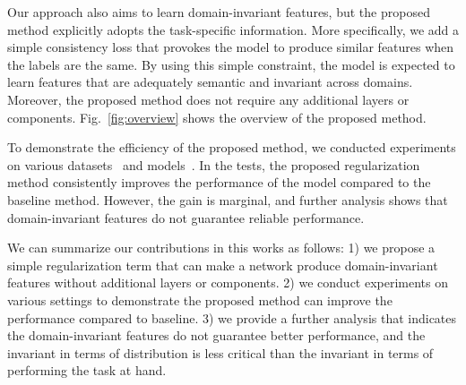 Our approach also aims to learn domain-invariant features, but the proposed method explicitly adopts the task-specific information. More specifically, we add a simple consistency loss that provokes the model to produce similar features when the labels are the same. By using this simple constraint, the model is expected to learn features that are adequately semantic and invariant across domains. Moreover, the proposed method does not require any additional layers or components. Fig.~\ref{fig:overview} shows the overview of the proposed method.

To demonstrate the efficiency of the proposed method, we conducted experiments on various datasets~\cite{chen2013vlcs, Li2017dg} and models~\cite{He2016resnet}. In the tests, the proposed regularization method consistently improves the performance of the model compared to the baseline method. However, the gain is marginal, and further analysis shows that domain-invariant features do not guarantee reliable performance.

We can summarize our contributions in this works as follows: 1) we propose a simple regularization term that can make a network produce domain-invariant features without additional layers or components. 2) we conduct experiments on various settings to demonstrate the proposed method can improve the performance compared to baseline. 3) we provide a further analysis that indicates the domain-invariant features do not guarantee better performance, and the invariant in terms of distribution is less critical than the invariant in terms of performing the task at hand. 

